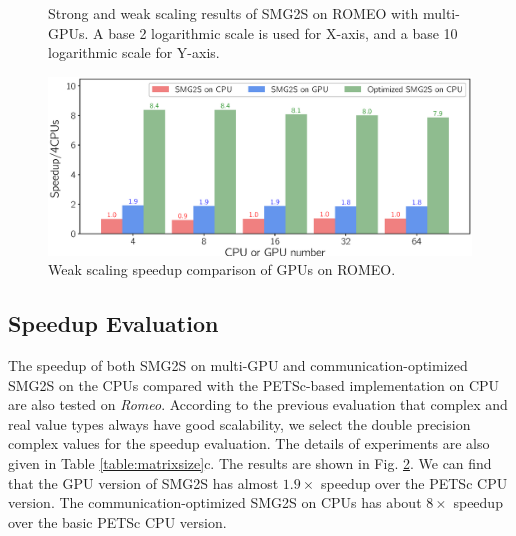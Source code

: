 \begin{figure}[t]
	\centering
	\caption{Strong and weak scaling results of SMG2S on ROMEO with multi-GPUs. A base 2 logarithmic scale is used for X-axis, and a base 10 logarithmic scale for Y-axis. }
	\label{fig:scaling-gpu-romeo}
\end{figure}

\begin{figure}[t]
	\centering
	\hfil
	\includegraphics[width=0.99\linewidth]{fig/matgen/speedup.eps}%
	\caption{Weak scaling speedup comparison of GPUs on ROMEO.}
	\label{speedup}
\end{figure}

\subsection{Speedup Evaluation}

The speedup of both SMG2S on multi-GPU and communication-optimized SMG2S on the CPUs compared with the PETSc-based implementation on CPU are also tested on \textit{Romeo}. According to the previous evaluation that complex and real value types always have good scalability, we select the double precision complex values for the speedup evaluation. The details of experiments are also given in Table \ref{table:matrixsize}c. The results are shown in Fig. \ref{speedup}. We can find that the GPU version of SMG2S has almost $1.9\times$ speedup over the PETSc CPU version. The communication-optimized SMG2S on CPUs has about $8\times$ speedup over the basic PETSc CPU version.

